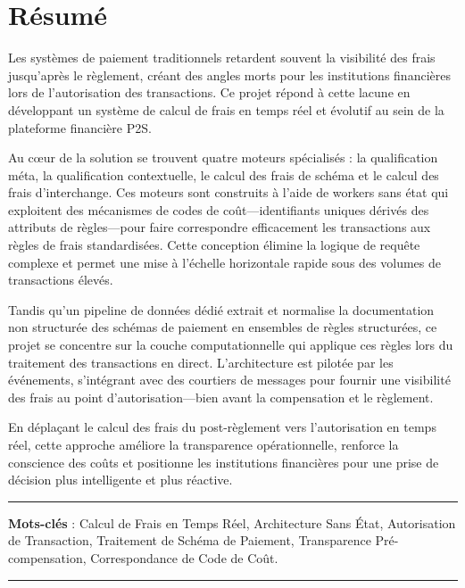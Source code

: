 \section*{Résumé}

Les systèmes de paiement traditionnels retardent souvent la visibilité des frais jusqu'après le règlement, créant des angles morts pour les institutions financières lors de l'autorisation des transactions. Ce projet répond à cette lacune en développant un système de calcul de frais en temps réel et évolutif au sein de la plateforme financière P2S.

Au cœur de la solution se trouvent quatre moteurs spécialisés : la qualification méta, la qualification contextuelle, le calcul des frais de schéma et le calcul des frais d'interchange. Ces moteurs sont construits à l'aide de workers sans état qui exploitent des mécanismes de codes de coût—identifiants uniques dérivés des attributs de règles—pour faire correspondre efficacement les transactions aux règles de frais standardisées. Cette conception élimine la logique de requête complexe et permet une mise à l'échelle horizontale rapide sous des volumes de transactions élevés.

Tandis qu'un pipeline de données dédié extrait et normalise la documentation non structurée des schémas de paiement en ensembles de règles structurées, ce projet se concentre sur la couche computationnelle qui applique ces règles lors du traitement des transactions en direct. L'architecture est pilotée par les événements, s'intégrant avec des courtiers de messages pour fournir une visibilité des frais au point d'autorisation—bien avant la compensation et le règlement.

En déplaçant le calcul des frais du post-règlement vers l'autorisation en temps réel, cette approche améliore la transparence opérationnelle, renforce la conscience des coûts et positionne les institutions financières pour une prise de décision plus intelligente et plus réactive.

\vspace{1cm}
\begin{flushleft}
\rule{\textwidth}{0.4pt}\par
\textbf{Mots-clés} : Calcul de Frais en Temps Réel, Architecture Sans État, Autorisation de Transaction, Traitement de Schéma de Paiement, Transparence Pré-compensation, Correspondance de Code de Coût.\par
\rule[0.55\baselineskip]{\textwidth}{0.4pt}
\end{flushleft}
\pagebreak